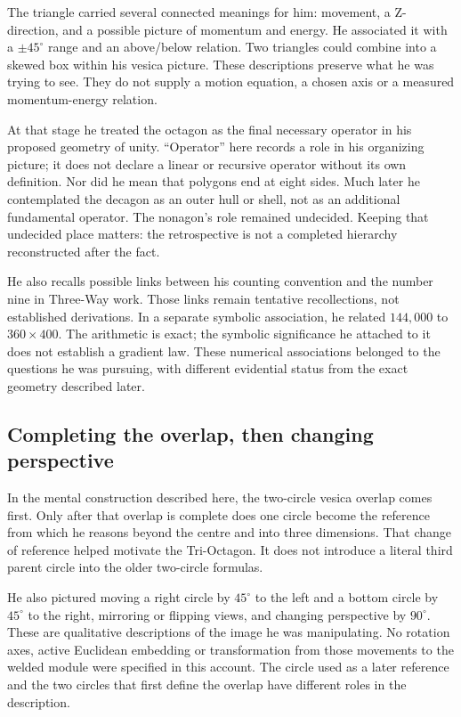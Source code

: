 The triangle carried several connected meanings for him: movement, a Z-direction, and a possible picture of momentum and energy. He associated it with a $\pm45^\circ$ range and an above/below relation. Two triangles could combine into a skewed box within his vesica picture. These descriptions preserve what he was trying to see. They do not supply a motion equation, a chosen axis or a measured momentum-energy relation.

At that stage he treated the octagon as the final necessary operator in his proposed geometry of unity. ``Operator'' here records a role in his organizing picture; it does not declare a linear or recursive operator without its own definition. Nor did he mean that polygons end at eight sides. Much later he contemplated the decagon as an outer hull or shell, not as an additional fundamental operator. The nonagon's role remained undecided. Keeping that undecided place matters: the retrospective is not a completed hierarchy reconstructed after the fact.

He also recalls possible links between his counting convention and the number nine in Three-Way work. Those links remain tentative recollections, not established derivations. In a separate symbolic association, he related $144{,}000$ to $360\times400$. The arithmetic is exact; the symbolic significance he attached to it does not establish a gradient law. These numerical associations belonged to the questions he was pursuing, with different evidential status from the exact geometry described later.

\subsection*{Completing the overlap, then changing perspective}
In the mental construction described here, the two-circle vesica overlap comes first. Only after that overlap is complete does one circle become the reference from which he reasons beyond the centre and into three dimensions. That change of reference helped motivate the Tri-Octagon. It does not introduce a literal third parent circle into the older two-circle formulas.

He also pictured moving a right circle by $45^\circ$ to the left and a bottom circle by $45^\circ$ to the right, mirroring or flipping views, and changing perspective by $90^\circ$. These are qualitative descriptions of the image he was manipulating. No rotation axes, active Euclidean embedding or transformation from those movements to the welded module were specified in this account. The circle used as a later reference and the two circles that first define the overlap have different roles in the description.

